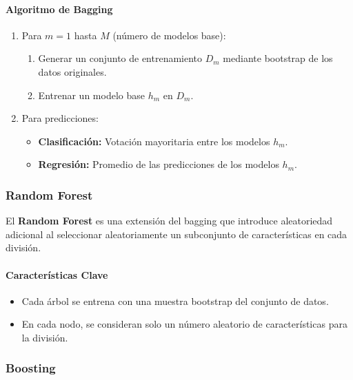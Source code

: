 \documentclass[a4paper, 11pt]{article}
\begin{document}
\paragraph{Algoritmo de Bagging}

\begin{enumerate}
    \item Para $m = 1$ hasta $M$ (número de modelos base):
    \begin{enumerate}
        \item Generar un conjunto de entrenamiento $D_m$ mediante bootstrap de los datos originales.
        \item Entrenar un modelo base $h_m$ en $D_m$.
    \end{enumerate}
    \item Para predicciones:
    \begin{itemize}
        \item \textbf{Clasificación:} Votación mayoritaria entre los modelos $h_m$.
        \item \textbf{Regresión:} Promedio de las predicciones de los modelos $h_m$.
    \end{itemize}
\end{enumerate}

\subsubsection{Random Forest}

El \textbf{Random Forest} es una extensión del bagging que introduce aleatoriedad adicional al seleccionar aleatoriamente un subconjunto de características en cada división.

\paragraph{Características Clave}

\begin{itemize}
    \item Cada árbol se entrena con una muestra bootstrap del conjunto de datos.
    \item En cada nodo, se consideran solo un número aleatorio de características para la división.
\end{itemize}

\subsubsection{Boosting}
\end{document}

